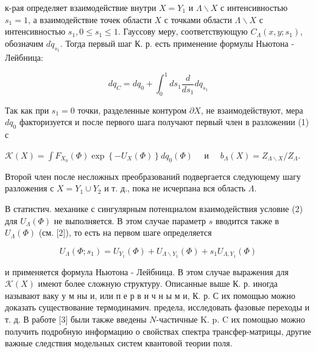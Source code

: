 \documentclass[10pt]{article}
\begin{document}
к-рая определяет взаимодействие внутри $X=Y_{1}$ и $\Lambda \backslash X$ с интенсивностью $s_{1}=1$, а взаимодействие точек области $X$ с точками области $\Lambda \backslash X$ с интенсивностью $s_{1}, 0 \leqslant s_{1} \leqslant 1$. Гауссову меру, соответствующую $C_{\Lambda}\left(x, y ; s_{1}\right)$, обозначим $d q_{s_{1}}$. Тогда первый шаг К. р. есть применение формулы Ньютона - Лейбница:



\[

d q_{C}=d q_{0}+\int_{0}^{1} d s_{1} \frac{d}{d s_{1}} d q_{s_{1}}

\]



Так как при $s_{1}=0$ точки, разделенные контуром $\partial X$, не взаимодействуют, мера $d q_{0}$ факторизуется и после первого шага получают первый член в разложении (1) с



$\mathscr{K}(X)=\int F_{X_{0}}(\Phi) \exp \left\{-U_{X}(\Phi)\right\} d q_{0}(\Phi) \quad$ и $\quad b_{\Lambda}(X)=Z_{\Lambda \backslash X} / Z_{\Lambda}$.



Второй член после несложных преобразований подвергается следующему шагу разложения с $X=Y_{1} \cup Y_{2}$ и т. д., пока не исчерпана вся область $\Lambda$.



В статистич. механике с сингулярным потенциалом взаимодействия условие (2) для $U_{\Lambda}(\Phi)$ не выполняется. В этом случае параметр $s$ вводится также в $U_{\Lambda}(\Phi)$ (см. [2]), то есть на первом шаге определяется



\[

U_{\Lambda}\left(\Phi ; s_{1}\right)=U_{Y_{1}}(\Phi)+U_{\Lambda \backslash Y_{1}}(\Phi)+s_{1} U_{\Lambda, Y_{1}}(\Phi)

\]



и применяется формула Ньютона - Лейбница. В этом случае выражения для $\mathcal{K}(X)$ имеют более сложную структуру. Описанные выше К. р. иногда называют ваку у м ны и, или п е р в и ч н ы м и, К. р. С их помощью можно доказать существование термодинамич. предела, исследовать фазовые переходы и т. д. В работе [3] были также введены $N$-частичные K. p. C их помощью можно получить подробную информацию о свойствах спектра трансфер-матрицы, другие важные следствия модельных систем квантовой теории поля.
\end{document}
